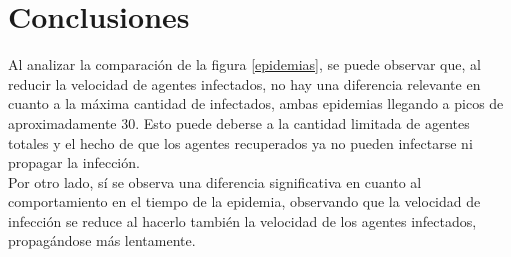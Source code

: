 \documentclass{article}
\begin{document}
\section{Conclusiones}

Al analizar la comparaci\'on de la figura \ref{epidemias}, se puede observar que, al reducir la velocidad de agentes infectados, no hay una diferencia relevante en cuanto a la m\'axima cantidad de infectados, ambas epidemias llegando a picos de aproximadamente 30. Esto puede deberse a la cantidad limitada de agentes totales y el hecho de que los agentes recuperados ya no pueden infectarse ni propagar la infecci\'on.\\

Por otro lado, s\'i se observa una diferencia significativa en cuanto al comportamiento en el tiempo de la epidemia, observando que la velocidad de infecci\'on se reduce al hacerlo tambi\'en la velocidad de los agentes infectados, propag\'andose m\'as lentamente.



\end{document}
